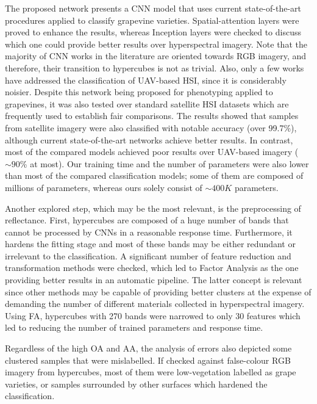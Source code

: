 The proposed network presents a CNN model that uses current state-of-the-art procedures applied to classify grapevine varieties. Spatial-attention layers were proved to enhance the results, whereas Inception layers were checked to discuss which one could provide better results over hyperspectral imagery. Note that the majority of CNN works in the literature are oriented towards RGB imagery, and therefore, their transition to hypercubes is not as trivial. Also, only a few works have addressed the classification of UAV-based HSI, since it is considerably noisier. Despite this network being proposed for phenotyping applied to grapevines, it was also tested over standard satellite HSI datasets which are frequently used to establish fair comparisons. The results showed that samples from satellite imagery were also classified with notable accuracy (over 99.7\%), although current state-of-the-art networks achieve better results. In contrast, most of the compared models achieved poor results over UAV-based imagery ($\sim90$\% at most). Our training time and the number of parameters were also lower than most of the compared classification models; some of them are composed of millions of parameters, whereas ours solely consist of $\sim400K$ parameters. 

Another explored step, which may be the most relevant, is the preprocessing of reflectance. First, hypercubes are composed of a huge number of bands that cannot be processed by CNNs in a reasonable response time. Furthermore, it hardens the fitting stage and most of these bands may be either redundant or irrelevant to the classification. A significant number of feature reduction and transformation methods were checked, which led to Factor Analysis as the one providing better results in an automatic pipeline. The latter concept is relevant since other methods may be capable of providing better clusters at the expense of demanding the number of different materials collected in hyperspectral imagery. Using FA, hypercubes with 270 bands were narrowed to only 30 features which led to reducing the number of trained parameters and response time. 

Regardless of the high OA and AA, the analysis of errors also depicted some clustered samples that were mislabelled. If checked against false-colour RGB imagery from hypercubes, most of them were low-vegetation labelled as grape varieties, or samples surrounded by other surfaces which hardened the classification. 

